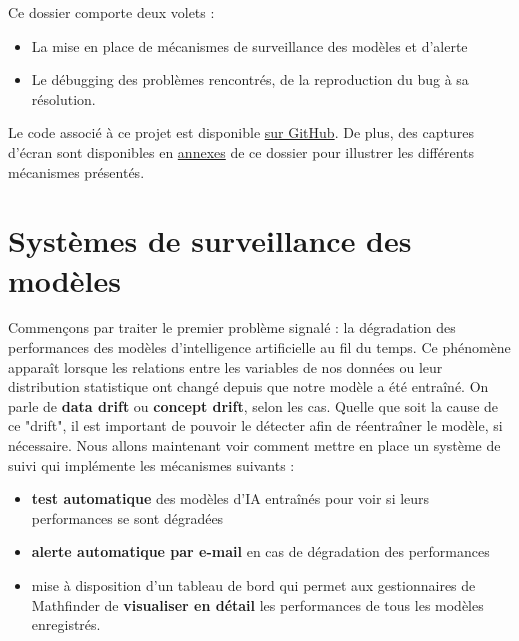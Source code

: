 \documentclass[french]{article}
\begin{document}
    Ce dossier comporte deux volets :
    \begin{itemize}
        \item La mise en place de mécanismes de surveillance des modèles et d'alerte
        \item Le débugging des problèmes rencontrés, de la reproduction du bug à sa résolution.
    \end{itemize}
    Le code associé à ce projet est disponible \href{https://github.com/vinpap/mathfinder}{sur GitHub}. De plus, des captures d'écran sont disponibles en \hyperref[sec:annexes]{annexes} de ce dossier pour illustrer les différents mécanismes présentés.

    \section{Systèmes de surveillance des modèles}
    Commençons par traiter le premier problème signalé : la dégradation des performances des modèles d'intelligence artificielle au fil du temps. Ce phénomène apparaît lorsque les relations entre les variables de nos données ou leur distribution statistique ont changé depuis que notre modèle a été entraîné. On parle de \textbf{data drift} ou \textbf{concept drift}, selon les cas. 
    Quelle que soit la cause de ce "drift", il est important de pouvoir le détecter afin de réentraîner le modèle, si nécessaire. Nous allons maintenant voir comment mettre en place un système de suivi qui implémente les mécanismes suivants :
    \begin{itemize}
        \item \textbf{test automatique} des modèles d'IA entraînés pour voir si leurs performances se sont dégradées
        \item \textbf{alerte automatique par e-mail} en cas de dégradation des performances
        \item mise à disposition d'un tableau de bord qui permet aux gestionnaires de Mathfinder de \textbf{visualiser en détail} les performances de tous les modèles enregistrés.
    \end{itemize}
\end{document}
